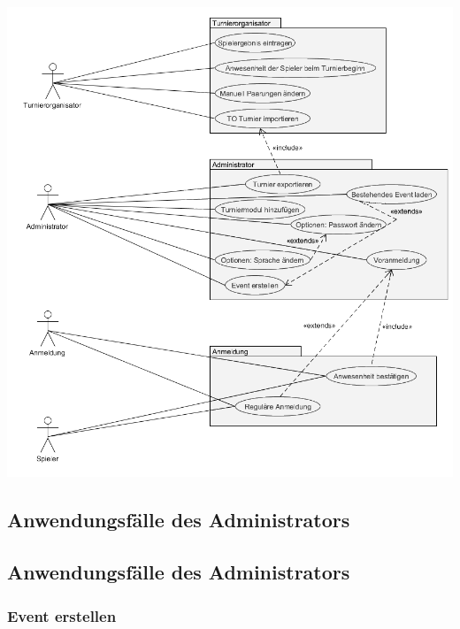 \documentclass[11pt]{article}
\begin{document}
\includegraphics[width=\textwidth]{UseCaseDiagram.png}

\subsection{Anwendungsfälle des Administrators}

\subsection{Anwendungsfälle des Administrators}

\subsubsection{Event erstellen}
\end{document}
